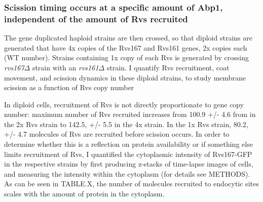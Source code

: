 			\subsubsection{Scission timing occurs at a specific amount of Abp1, \\
			independent of the amount of Rvs recruited}
			The gene duplicated haploid strains are then crossed, so that diploid strains are generated that have 4x copies of the Rvs167 and Rvs161 genes, 2x copies each (WT number). Strains containing 1x copy of each Rvs is generated by crossing \textit{rvs167$\Delta$} strain with an \textit{rvs161$\Delta$} strain. I quantify Rvs recruitment, coat movement, and scission dynamics in these diploid strains, to study membrane scission as a function of Rvs copy number
		

	
			\vspace{5mm}
			In diploid cells, recruitment of Rvs is not directly proportionate to gene copy number: maximum number of Rvs recruited increases from 100.9 +/- 4.6 from in the 2x Rvs strain to 142.5, +/- 5.5 in the 4x strain. In the 1x Rvs strain, 80.2, +/- 4.7 molecules of Rvs are recruited before scission occurs. In order to determine whether this is a reflection on protein availability or if something else limits recruitment of Rvs, I quantified the cytoplasmic intensity of Rvs167-GFP in the respective strains by first producing z-stacks of time-lapse images of cells, and measuring the intensity within the cytoplasm (for details see METHODS). 	As can be seen in TABLE.X, the number of molecules recruited to endocytic sites scales with the amount of protein in the cytoplasm.  
			

